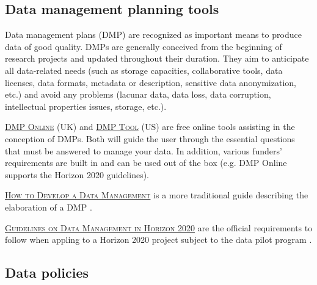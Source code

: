 \subsection{Data management planning tools}

Data management plans (DMP) are recognized as important means to produce data of good quality. DMPs are generally conceived from the beginning of research projects and updated throughout their duration. They aim to anticipate all data-related needs (such as storage capacities, collaborative tools, data licenses, data formats, metadata or description, sensitive data anonymization, etc.) and avoid any problems (lacunar data, data loss, data corruption, intellectual properties issues, storage, etc.).

\vspace{0.4cm}

\noindent {}  \textsc{\href{http://dmponline.dcc.ac.uk/}{DMP Online}} (UK) and \textsc{\href{https://dmptool.org/}{DMP Tool}} (US) are free online tools assisting in the conception of DMPs. Both will guide the user through the essential questions that must be answered to manage your data. In addition, various funders' requirements are built in and can be used out of the box (e.g. DMP Online supports the Horizon 2020 guidelines)\cite{dmponline_dmponline_2015,dmptool_dmptool_2015}. 

\vspace{0.4cm}

\noindent {} \textsc{\href{http://www.dcc.ac.uk/resources/how-guides/develop-data-plan}{How to Develop a Data Management}} is a more traditional guide describing the elaboration of a DMP \cite{digital_curation_centre_how_2015}.

\vspace{0.4cm}

\noindent {} \textsc{\href{http://ec.europa.eu/research/participants/data/ref/h2020/grants_manual/hi/oa_pilot/h2020-hi-oa-data-mgt_en.pdf}{Guidelines on Data Management in Horizon 2020}} are the official requirements to follow when appling to a Horizon 2020 project subject to the data pilot program \cite{european_comission_guidelines_2013}.

\vspace{0.4cm}

\subsection{Data policies}

